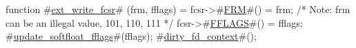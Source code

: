 function #\hyperref[sailRISCVzextzywritezyfcsr]{ext\_write\_fcsr}# (frm, fflags) = {
  fcsr->#\hyperref[sailRISCVzFRM]{FRM}#()    = frm;      /* Note: frm can be an illegal value, 101, 110, 111 */
  fcsr->#\hyperref[sailRISCVzFFLAGS]{FFLAGS}#() = fflags;
  #\hyperref[sailRISCVzupdatezysoftfloatzyfflags]{update\_softfloat\_fflags}#(fflags);
  #\hyperref[sailRISCVzdirtyzyfdzycontext]{dirty\_fd\_context}#();
}

